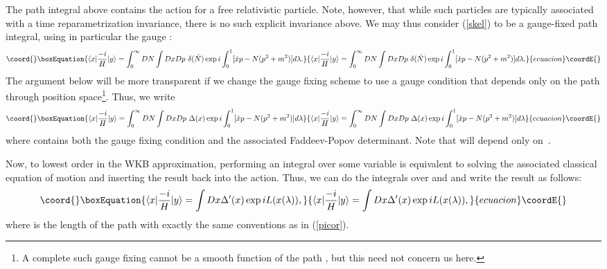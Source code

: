 \documentclass[a4paper,12pt]{article}
\begin{document}
The path integral above contains the action for a free relativistic
particle.  Note, however, that while such particles are typically
associated with a time reparametrization invariance, there is no such
explicit invariance above.  We may thus consider (\ref{skel}) to be a
gauge-fixed path integral, using in particular the gauge \coordHE{}:
\begin{equation}\coord{}\boxEquation{
\label{skel2}
\langle x| \frac{-i}{H}| y \rangle = \int_0^\infty  DN
\int Dx Dp \ \delta(\dot N) \exp{i \int_0^1 [\dot{x}p - N(p^2 + m^2)]
d\lambda}.
}{
\langle x| \frac{-i}{H}| y \rangle = \int_0^\infty  DN
\int Dx Dp \ \delta(\dot N) \exp{i \int_0^1 [\dot{x}p - N(p^2 + m^2)]
d\lambda}.
}{ecuacion}\coordE{}\end{equation}
The argument below will be more transparent if we change the gauge
fixing scheme to use a gauge condition that depends only
on the path \coordHE{} through position space\footnote{A
complete such gauge fixing cannot be a smooth function of the
path \coordHE{}, but this need not concern us here.}.  Thus, 
we write
\begin{equation}\coord{}\boxEquation{
\label{skel3}
\langle x| \frac{-i}{H}| y \rangle = \int_0^\infty  DN
\int Dx Dp \  \Delta(x) \exp{i \int_0^1 [\dot{x}p - N(p^2 + m^2)]
d\lambda}
}{
\langle x| \frac{-i}{H}| y \rangle = \int_0^\infty  DN
\int Dx Dp \  \Delta(x) \exp{i \int_0^1 [\dot{x}p - N(p^2 + m^2)]
d\lambda}
}{ecuacion}\coordE{}\end{equation}
where \coordHE{} contains both the gauge fixing condition
and the associated Faddeev-Popov determinant.  Note that \coordHE{}
will depend only on~\coordHE{}.

Now, to lowest order in the WKB approximation, performing an integral
over some variable is equivalent to solving the associated classical
equation of motion and inserting the result back into the action.
Thus, we can do the integrals over \coordHE{} and \coordHE{} and write the result as
follows:
\begin{equation}\coord{}\boxEquation{
\label{skel4}
\langle x| \frac{-i}{H}| y \rangle = 
\int Dx \Delta'(x) \exp{i L(x(\lambda))},
}{
\langle x| \frac{-i}{H}| y \rangle = 
\int Dx \Delta'(x) \exp{i L(x(\lambda))},
}{ecuacion}\coordE{}\end{equation}
where \coordHE{} is the length of the path \coordHE{}
with exactly the same conventions as in (\ref{picor}).
\end{document}
